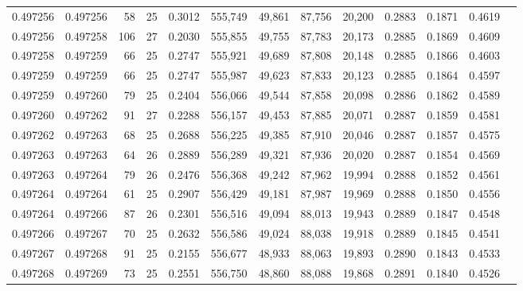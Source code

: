 \begin{tabular}{rrrrrrrrrrrrr}
0.497256 & 0.497256 &  58 &  25 &                                     0.3012 & 555,749 &  49,861 &  87,756 &  20,200 & 0.2883 & 0.1871 & 0.4619 \\
0.497256 & 0.497258 & 106 &  27 &                                     0.2030 & 555,855 &  49,755 &  87,783 &  20,173 & 0.2885 & 0.1869 & 0.4609 \\
0.497258 & 0.497259 &  66 &  25 &                                     0.2747 & 555,921 &  49,689 &  87,808 &  20,148 & 0.2885 & 0.1866 & 0.4603 \\
0.497259 & 0.497259 &  66 &  25 &                                     0.2747 & 555,987 &  49,623 &  87,833 &  20,123 & 0.2885 & 0.1864 & 0.4597 \\
0.497259 & 0.497260 &  79 &  25 &                                     0.2404 & 556,066 &  49,544 &  87,858 &  20,098 & 0.2886 & 0.1862 & 0.4589 \\
0.497260 & 0.497262 &  91 &  27 &                                     0.2288 & 556,157 &  49,453 &  87,885 &  20,071 & 0.2887 & 0.1859 & 0.4581 \\
0.497262 & 0.497263 &  68 &  25 &                                     0.2688 & 556,225 &  49,385 &  87,910 &  20,046 & 0.2887 & 0.1857 & 0.4575 \\
0.497263 & 0.497263 &  64 &  26 &                                     0.2889 & 556,289 &  49,321 &  87,936 &  20,020 & 0.2887 & 0.1854 & 0.4569 \\
0.497263 & 0.497264 &  79 &  26 &                                     0.2476 & 556,368 &  49,242 &  87,962 &  19,994 & 0.2888 & 0.1852 & 0.4561 \\
0.497264 & 0.497264 &  61 &  25 &                                     0.2907 & 556,429 &  49,181 &  87,987 &  19,969 & 0.2888 & 0.1850 & 0.4556 \\
0.497264 & 0.497266 &  87 &  26 &                                     0.2301 & 556,516 &  49,094 &  88,013 &  19,943 & 0.2889 & 0.1847 & 0.4548 \\
0.497266 & 0.497267 &  70 &  25 &                                     0.2632 & 556,586 &  49,024 &  88,038 &  19,918 & 0.2889 & 0.1845 & 0.4541 \\
0.497267 & 0.497268 &  91 &  25 &                                     0.2155 & 556,677 &  48,933 &  88,063 &  19,893 & 0.2890 & 0.1843 & 0.4533 \\
0.497268 & 0.497269 &  73 &  25 &                                     0.2551 & 556,750 &  48,860 &  88,088 &  19,868 & 0.2891 & 0.1840 & 0.4526 \\

\end{tabular}
